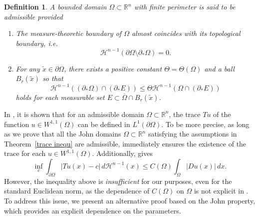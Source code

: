 \documentclass[reqno,11pt]{amsart}
\makeatletter
\newtheorem{defn}[thm]{Definition}%
\numberwithin{equation}{section}
\theoremstyle{remark}
\makeatother
\begin{document}
\begin{defn}\label{admissible}
    A bounded domain $\Omega\subset\mathbb R^n$ with finite perimeter is said to be admissible provided
    \begin{enumerate}
        \item [(i)] The measure-theoretic boundary of $\Omega$ almost coincides with its topological boundary, i.e.\
        \begin{equation}\label{almost theoretic}
            \mathcal{H}^{n-1}(\partial \Omega\setminus\partial_{*}\Omega)=0.
        \end{equation}
        \item [(ii)] For any $\widetilde x\in\partial\Omega$, there exists a positive constant $\Theta=\Theta(\Omega)$ and a ball $B_r(\widetilde x)$ so that 
         \begin{equation}\label{admissible 2}
         \mathcal H^{n-1}((\partial_{*} \Omega)\cap (\partial_* E))\le \Theta \mathcal H^{n-1}(\Omega\cap (\partial_* E))
         \end{equation}
         holds for each measurable set $E\subset\overline{\Omega}\cap B_r(\widetilde x)$.
    \end{enumerate}
\end{defn}

 
     In  \cite{Z1989}, it is shown that for an admissible domain $\Omega\subset \mathbb R^n$, the trace $Tu$ of the function  $u\in W^{1,1}(\Omega)$ can be defined in $L^1(\partial\Omega)$. To be more precise, as long as we prove that all the John domains $\Omega\subset\mathbb R^n$ satisfying the assumptions in Theorem~\ref{trace inequ} are admissible, \cite[Theorem 5.14.4]{Z1989} immediately ensures the existence of the trace for each $u\in W^{1,1}(\Omega)$. Additionally,   \cite[Theorem 5.10.7]{Z1989}   gives 
 $$\inf_c \int_{\partial\Omega} |Tu(x)-c|\, d\mathcal{H}^{n-1}(x)\le C(\Omega)\int_{\Omega} |Du(x)|\,dx.$$
  However, the inequality above is \emph{insufficient} for our purposes, even for the standard Euclidean norm, as the dependence of $C(\Omega)$ on $\Omega$ is not explicit in \cite[Theorem 5.10.7]{Z1989}. To address this issue, we present an alternative proof based on the John property, which provides an explicit dependence on the parameters. 
\end{document}
